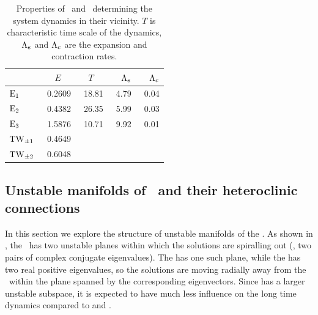 \begin{table}[h!]
    \caption{
    Properties of \eqva\ and \reqva\ determining
    the system dynamics in their vicinity.  $T$ is characteristic
    time scale of the dynamics, $\Lambda_e$ and $\Lambda_c$ are the
    expansion and contraction rates.
            }
\begin{center} \footnotesize
    \begin{tabular}{l|rrrr}
                 & $E$~~   & $T$~~  & $\Lambda_e$  & $\Lambda_c$  \\ \hline
 $\EQV{1}\ $     &\ 0.2609 &\ 18.81 &\ 4.79     &\ 0.04 \\
 $\EQV{2}\ $     &\ 0.4382 &\ 26.35 &\ 5.99     &\ 0.03 \\
 $\EQV{3}\ $     &\ 1.5876 &\ 10.71 &\ 9.92     &\ 0.01 \\
 $\mathrm{TW}_{\pm1}$ &\ 0.4649 &  &  & \\
 $\mathrm{TW}_{\pm2}$ &\ 0.6048 &  &  & \\
    \end{tabular}
\end{center}
\label{tab:L22cminus}
\end{table}

\subsection{Unstable manifolds of \eqva\ and their heteroclinic
            connections}
\label{sec:unstMnflds}

In this section we explore the structure of unstable
manifolds of the {\eqva}.  As shown in ,
the  \eqv\ has two unstable
planes within which the solutions are spiralling out (\ie, two
pairs of complex conjugate eigenvalues).  The  has one such plane,
while the  has two real positive eigenvalues, so the solutions are
moving radially away from the \eqv\ within the plane spanned
by the corresponding eigenvectors.  Since  has
a larger unstable subspace, it is expected to have much less influence on the
long time dynamics compared to  and .

